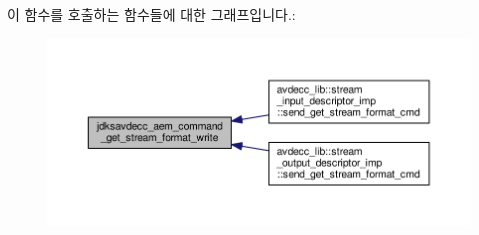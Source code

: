 이 함수를 호출하는 함수들에 대한 그래프입니다.\+:
\nopagebreak
\begin{figure}[H]
\begin{center}
\leavevmode
\includegraphics[width=350pt]{group__command__get__stream__format_ga9195ddf9def8d3d66d0d516ed78df680_icgraph}
\end{center}
\end{figure}


